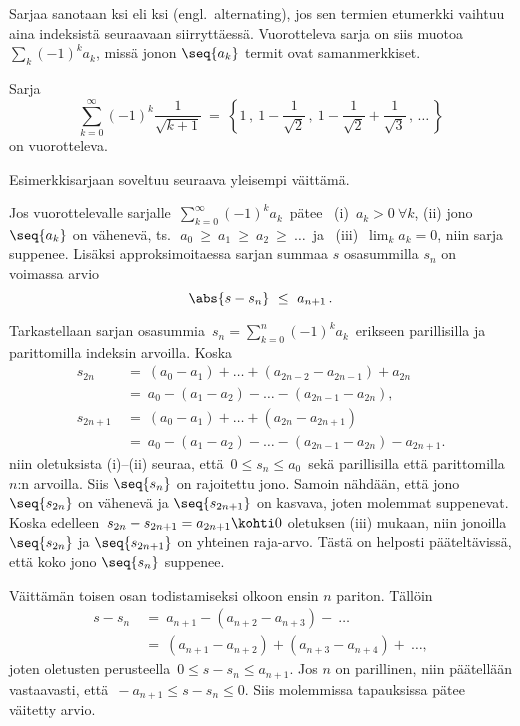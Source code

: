Sarjaa sanotaan ksi eli ksi (engl.\ alternating), jos sen 
termien etumerkki vaihtuu aina indeksistä seuraavaan siirryttäessä. Vuorotteleva sarja on siis
muotoa $\sum_k (-1)^k a_k$, missä jonon $\seq{a_k}$ termit ovat samanmerkkiset.
\begin{Exa} \label{muuan vuorotteleva sarja} Sarja
\[
\sum_{k=0}^\infty (-1)^k \dfrac{1}{\sqrt{k+1}}\ 
=\ \left\{1\,,\ 1-\frac{1}{\sqrt{2}}\,,\ 1-\frac{1}{\sqrt{2}}
                                          +\frac{1}{\sqrt{3}}\,,\,\ldots\,\right\}
\]
on vuorotteleva. \loppu \end{Exa}
Esimerkkisarjaan soveltuu seuraava yleisempi väittämä.
\begin{Lause} \label{alternoiva sarja} Jos vuorottelevalle sarjalle 
$\,\sum_{k=0}^\infty (-1)^k a_k\,$ pätee \ (i) $\,a_k>0\ \forall k$, (ii) jono $\seq{a_k}$
on vähenevä, ts.\ $\,a_0\ \ge\ a_1\ \ge\ a_2\ \ge\ \ldots\,$ ja \ (iii) $\,\lim_k a_k = 0$,
niin sarja suppenee. Lisäksi approksimoitaessa sarjan summaa $s$ osasummilla $s_n$ on voimassa
arvio
\[ 
\abs{s - s_n}\ \le\ a_{n+1}\,. 
\] 
\end{Lause}
\tod Tarkastellaan sarjan osasummia $\,s_n = \sum_{k=0}^n (-1)^k a_k\,$ erikseen parillisilla
ja parittomilla indeksin arvoilla. Koska
\begin{align*}
s_{2n}    &=\ (a_0-a_1) + \ldots + (a_{2n-2}-a_{2n-1}) + a_{2n} \\    
          &=\ a_0 - (a_1 - a_2) - \ldots - (a_{2n-1} - a_{2n}), \\[2mm]
s_{2n+1}\ &=\ (a_0 - a_1) + \ldots + (a_{2n} - a_{2n+1}) \\
          &=\ a_0 - (a_1 - a_2) - \ldots - (a_{2n-1}-a_{2n}) - a_{2n+1}.
\end{align*}
niin oletuksista (i)--(ii) seuraa, että $\,0 \le s_n \le a_0\,$ sekä parillisilla että
parittomilla $n$:n arvoilla. Siis $\seq{s_n}$ on rajoitettu jono. Samoin nähdään, että jono 
$\seq{s_{2n}}$ on vähenevä ja $\seq{s_{2n+1}}$ on kasvava, joten molemmat suppenevat. Koska
edelleen $\,s_{2n} - s_{2n+1} = a_{2n+1} \kohti 0$ oletuksen (iii) mukaan, niin jonoilla
$\seq{s_{2n}}$ ja $\seq{s_{2n+1}}$ on yhteinen raja-arvo. Tästä on helposti pääteltävissä,
että koko jono $\seq{s_n}$ suppenee.

Väittämän toisen osan todistamiseksi olkoon ensin $n$ pariton. Tällöin
\begin{align*}
s - s_n\ &=\ a_{n+1} - (a_{n+2} - a_{n+3}) -\ \ldots \\
         &=\ (a_{n+1} - a_{n+2}) + (a_{n+3} - a_{n+4}) +\ \ldots,
\end{align*}
joten oletusten perusteella $\,0 \le s - s_n \le a_{n+1}$. Jos $n$ on parillinen, niin 
päätellään vastaavasti, että $\,- a_{n+1} \le s - s_n \le 0$. Siis molemmissa tapauksissa pätee
väitetty arvio. \loppu


